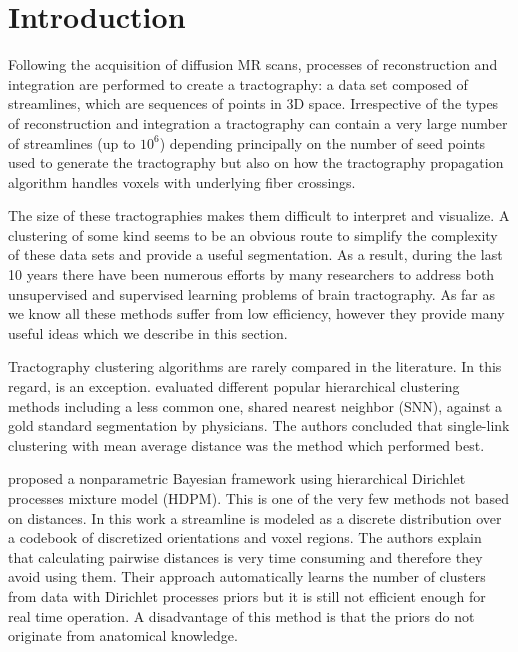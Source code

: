 \documentclass{bioinfo}
\begin{document}
\section{Introduction}

Following the acquisition of diffusion MR scans, processes of
reconstruction and integration are performed to create a tractography: a
data set composed of streamlines, which are sequences of points in 3D
space. Irrespective of the types of reconstruction and integration a
tractography can contain a very large number of streamlines (up to
$10^6$) depending principally on the number of seed points used to
generate the tractography but also on how the tractography propagation 
algorithm handles voxels with underlying fiber crossings.

The size of these tractographies makes them difficult to interpret and
visualize. A clustering of some kind seems to be an obvious route to
simplify the complexity of these data sets and provide a useful
segmentation.  As a result, during the last 10 years there have been
numerous efforts by many researchers to address both unsupervised and
supervised learning problems of brain tractography. 
As far as we know all these methods suffer from low efficiency, however 
they provide many useful ideas which we describe in this section.

Tractography clustering algorithms are rarely compared in the
literature.  In this regard, \citet{moberts2005evaluation} is an
exception. \citeauthor{moberts2005evaluation} evaluated different
popular hierarchical clustering methods including a less common one,
shared nearest neighbor (SNN), against a gold standard segmentation by
physicians. The authors concluded that single-link clustering with mean
average distance was the method which performed best.

\citet{wang2010tractography} proposed a nonparametric Bayesian framework
using hierarchical Dirichlet processes mixture model (HDPM). This is one
of the very few methods not based on distances. In this work a
streamline is modeled as a discrete distribution over a codebook of
discretized orientations and voxel regions. The authors explain that
calculating pairwise distances is very time consuming and therefore they
avoid using them. Their approach automatically learns the number of
clusters from data with Dirichlet processes priors but it is still not
efficient enough for real time operation. A disadvantage of this method
is that the priors do not originate from anatomical knowledge.
\end{document}
